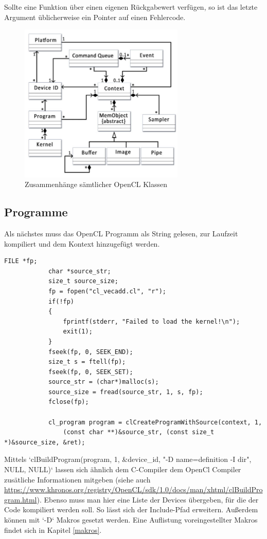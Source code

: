 			Sollte eine Funktion über einen eigenen Rückgabewert verfügen, so ist das letzte Argument üblicherweise ein Pointer auf einen Fehlercode.
			\begin{figure}[h]
				\centering
				\includegraphics[width=0.7\textwidth]{chapter4/pictures/class.png}
				\caption{Zusammenhänge sämtlicher OpenCL Klassen}
				\label{4:class}
			\end{figure}				
				
			\subsection{Programme}
			Als nächstes muss das OpenCL Programm als String gelesen, zur Laufzeit kompiliert und dem Kontext hinzugefügt werden. 
			\begin{lstlisting}[caption=OpenCL Programm]
			FILE *fp;
			char *source_str;
			size_t source_size;
			fp = fopen("cl_vecadd.cl", "r");
			if(!fp)
			{
				fprintf(stderr, "Failed to load the kernel!\n");
				exit(1);
			}
			fseek(fp, 0, SEEK_END);
			size_t s = ftell(fp);
			fseek(fp, 0, SEEK_SET); 
			source_str = (char*)malloc(s);
			source_size = fread(source_str, 1, s, fp);
			fclose(fp);
			
			cl_program program = clCreateProgramWithSource(context, 1, 
				(const char **)&source_str, (const size_t *)&source_size, &ret);
			\end{lstlisting}
			
			Mittels \li`clBuildProgram(program, 1, &device_id, "-D name=definition -I dir", NULL, NULL)` lassen sich ähnlich dem C-Compiler dem OpenCl Compiler zusätliche Informationen mitgeben (siehe auch \url{https://www.khronos.org/registry/OpenCL/sdk/1.0/docs/man/xhtml/clBuildProgram.html}). Ebenso muss man hier eine Liste der Devices übergeben, für die der Code kompiliert werden soll. So lässt sich der Include-Pfad erweitern. Außerdem können mit \li`-D` Makros gesetzt werden. Eine Auflistung voreingestellter Makros findet sich in Kapitel \ref{makros}.
			
